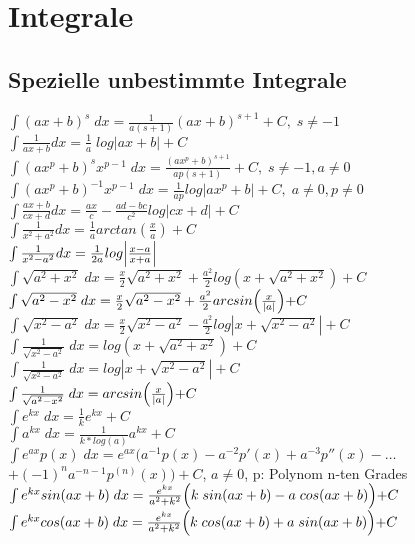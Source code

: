 
\section{Integrale}
\subsection{Spezielle unbestimmte Integrale}
${\int (ax+b)^s\;dx= \frac{1}{a(s+1)}(ax+b)^{s+1} + C,\;s\neq -1}$\\
${\int \frac{1}{ax+b}dx=\frac{1}{a}\;log|ax+b|+C}$\\
${\int (ax^p+b)^sx^{p-1}\;dx = \frac{(ax^p+b)^{s+1}}{ap(s+1)}+C,\;s\neq -1, a \neq 0}$\\
${\int (ax^p+b)^{-1}x^{p-1}\;dx=\frac{1}{ap}log|ax^p+b|+C,\;a\neq 0,p\neq 0}$\\
${\int \frac{ax+b}{cx+d}dx=\frac{ax}{c}- \frac{ad-bc}{c^2} log|cx+d|+C}$\\
${\int \frac{1}{x^2+a^2}dx=\frac{1}{a}arctan(\frac{x}{a})+C}$\\
${\int \frac{1}{x^2-a^2}dx=\frac{1}{2a}log\Bigl|\frac{x-a}{x+a}\Bigl|}$\\
${\int \sqrt{a^2+x^2}\;dx=\frac{x}{2}\sqrt{a^2+x^2}+\frac{a^2}{2} log(x+\sqrt{a^2+x^2})+C}$\\
${\int \sqrt{a^2-x^2}\;dx= \frac{x}{2}\sqrt{a^2-x^2}+\frac{a^2}{2}arcsin\Bigl(\frac{x}{|a|}\Bigl)+C}$\\
${\int \sqrt{x^2-a^2}\;dx= \frac{x}{2}\sqrt{x^2-a^2}-\frac{a^2}{2}log|x+\sqrt{x^2-a^2}|+C}$\\
${\int \frac{1}{\sqrt{x^2-a^2}}\;dx=log(x+\sqrt{a^2+x^2})+C}$\\
${\int \frac{1}{\sqrt{x^2-a^2}}\;dx=log|x+\sqrt{x^2-a^2}|+C}$\\
${\int \frac{1}{\sqrt{a^2-x^2}}\;dx=arcsin\Bigl(\frac{x}{|a|}\Bigl)+C}$\\
${\int e^{kx}\;dx=\frac{1}{k}e^{kx}+C}$\\
${\int a^{kx}\;dx=\frac{1}{k*log(a)}a^{kx}+C}$\\
${\int e^{ax}p(x)\;dx=e^{ax}(a^{-1}p(x)-a^{-2}p'(x)+a^{-3}p''(x)-\dots}$\\
${+(-1)^na^{-n-1}p^{(n)}(x))+C}$, $a\neq 0$, p: Polynom n-ten Grades\\
${\int e^{kx}sin(ax+b)\;dx=\frac{e^{kx}}{a^2+k^2}\Bigl(k\;sin(ax+b)- a\;cos(ax+b)\Bigl)+C}$\\
${\int e^{kx}cos(ax+b)\;dx=\frac{e^{kx}}{a^2 + k^2}\Bigl(k\;cos(ax+b)+a\;sin(ax+b)\Bigl)+C}$\\

